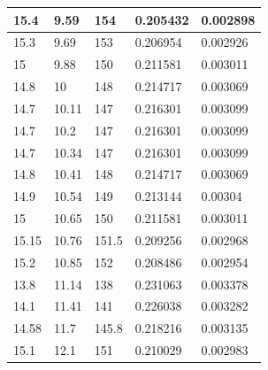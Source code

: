 \documentclass[%
 reprint,
 amsmath,amssymb,
 aps,
]{revtex4-2}
\begin{document}
\begin{table}[h!]
\begin{tabular}{|l|l|l|l|l|}
		15.4      & 9.59     & 154       & 0.205432    & 0.002898    \\ \hline
		15.3      & 9.69     & 153       & 0.206954    & 0.002926    \\ \hline
		15        & 9.88     & 150       & 0.211581    & 0.003011    \\ \hline
		14.8      & 10       & 148       & 0.214717    & 0.003069    \\ \hline
		14.7      & 10.11    & 147       & 0.216301    & 0.003099    \\ \hline
		14.7      & 10.2     & 147       & 0.216301    & 0.003099    \\ \hline
		14.7      & 10.34    & 147       & 0.216301    & 0.003099    \\ \hline
		14.8      & 10.41    & 148       & 0.214717    & 0.003069    \\ \hline
		14.9      & 10.54    & 149       & 0.213144    & 0.00304     \\ \hline
		15        & 10.65    & 150       & 0.211581    & 0.003011    \\ \hline
		15.15     & 10.76    & 151.5     & 0.209256    & 0.002968    \\ \hline
		15.2      & 10.85    & 152       & 0.208486    & 0.002954    \\ \hline
		13.8      & 11.14    & 138       & 0.231063    & 0.003378    \\ \hline
		14.1      & 11.41    & 141       & 0.226038    & 0.003282    \\ \hline
		14.58     & 11.7     & 145.8     & 0.218216    & 0.003135    \\ \hline
		15.1      & 12.1     & 151       & 0.210029    & 0.002983    \\ \hline
	\end{tabular}
\end{table}
\end{document}
